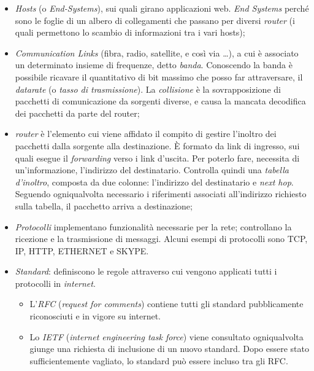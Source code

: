 \begin{itemize}
    \item
        \textit{Hosts} (o \textit{End-Systems}), sui quali girano applicazioni web. \textit{End Systems} perché sono le foglie di un albero di collegamenti che passano per diversi \textit{router} (i quali permettono lo scambio di informazioni tra i vari hosts);
    \item
        \textit{Communication Links} (fibra, radio, satellite, e così via \ldots), a cui è associato un determinato insieme di frequenze, detto \textit{banda}. Conoscendo la banda è possibile ricavare il quantitativo di bit massimo che posso far attraversare, il \textit{datarate} (o \textit{tasso di trasmissione}). La \textit{collisione} è la sovrapposizione di pacchetti di comunicazione da sorgenti diverse, e causa la mancata decodifica dei pacchetti da parte del router;
    \item
        \textit{router} è l'elemento cui viene affidato il compito di gestire l'inoltro dei pacchetti dalla sorgente alla destinazione. È formato da link di ingresso, sui quali esegue il \textit{forwarding} verso i link d'uscita. Per poterlo fare, necessita di un'informazione, l'indirizzo del destinatario. Controlla quindi una \textit{tabella d'inoltro}, composta da due colonne: l'indirizzo del destinatario e \textit{next hop}. Seguendo ogniqualvolta necessario i riferimenti associati all'indirizzo richiesto sulla tabella, il pacchetto arriva a destinazione;
    \item
        \textit{Protocolli} implementano funzionalità necessarie per la rete; controllano la ricezione e la trasmissione di messaggi. Alcuni esempi di protocolli sono TCP, IP, HTTP, ETHERNET e SKYPE.
    \item
        \textit{Standard}: definiscono le regole attraverso cui vengono applicati tutti i protocolli in \textit{internet}.
        \begin{itemize}
            \item L'\textit{RFC} (\textit{request for comments}) contiene tutti gli standard pubblicamente riconosciuti e in vigore su internet.
            \item Lo \textit{IETF} (\textit{internet engineering task force}) viene consultato ogniqualvolta giunge una richiesta di inclusione di un nuovo standard. Dopo essere stato sufficientemente vagliato, lo standard può essere incluso tra gli RFC.
        \end{itemize}
\end{itemize}

